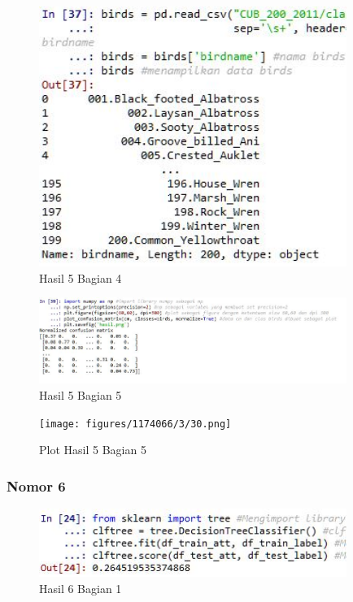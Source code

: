 
\begin{figure}[H]
\centerline{\includegraphics[width=10cm]{figures/1174066/3/28.jpg}}
\caption{Hasil 5 Bagian 4}
\label{labelgambar}
\end{figure}


\begin{figure}[H]
\centerline{\includegraphics[width=10cm]{figures/1174066/3/29.jpg}}
\caption{Hasil 5 Bagian 5}
\label{labelgambar}
\end{figure}

\begin{figure}[H]
\centerline{\texttt{[image: figures/1174066/3/30.png]}}
\caption{Plot Hasil 5 Bagian 5}
\label{labelgambar}
\end{figure}

\subsubsection{Nomor 6}
\hfill\break

\begin{figure}[H]
\centerline{\includegraphics[width=10cm]{figures/1174066/3/31.jpg}}
\caption{Hasil 6 Bagian 1}
\label{labelgambar}
\end{figure}

